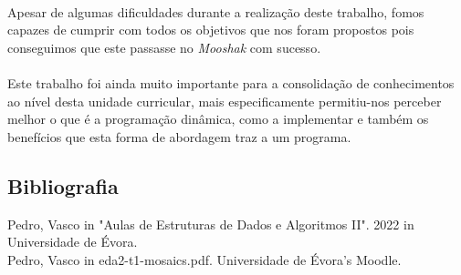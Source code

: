 \documentclass[12pt]{article}
\begin{document}
\paragraph{}
Apesar de algumas dificuldades durante a realização deste trabalho, fomos capazes de cumprir com todos os objetivos que nos foram propostos pois conseguimos que este passasse no \textit{Mooshak} com sucesso.
\paragraph{}
Este trabalho foi ainda muito importante para a consolidação de conhecimentos ao nível desta unidade curricular, mais especificamente permitiu-nos perceber melhor o que é a programação dinâmica, como a implementar e também os benefícios que esta forma de abordagem traz a um programa.

\newpage
\begin{center}
\section{Bibliografia}
\end{center}
Pedro, Vasco in "Aulas de Estruturas de Dados e Algoritmos II". 2022 in Universidade de Évora.
\\ Pedro, Vasco in eda2-t1-mosaics.pdf. Universidade de Évora's Moodle.
\end{document}
